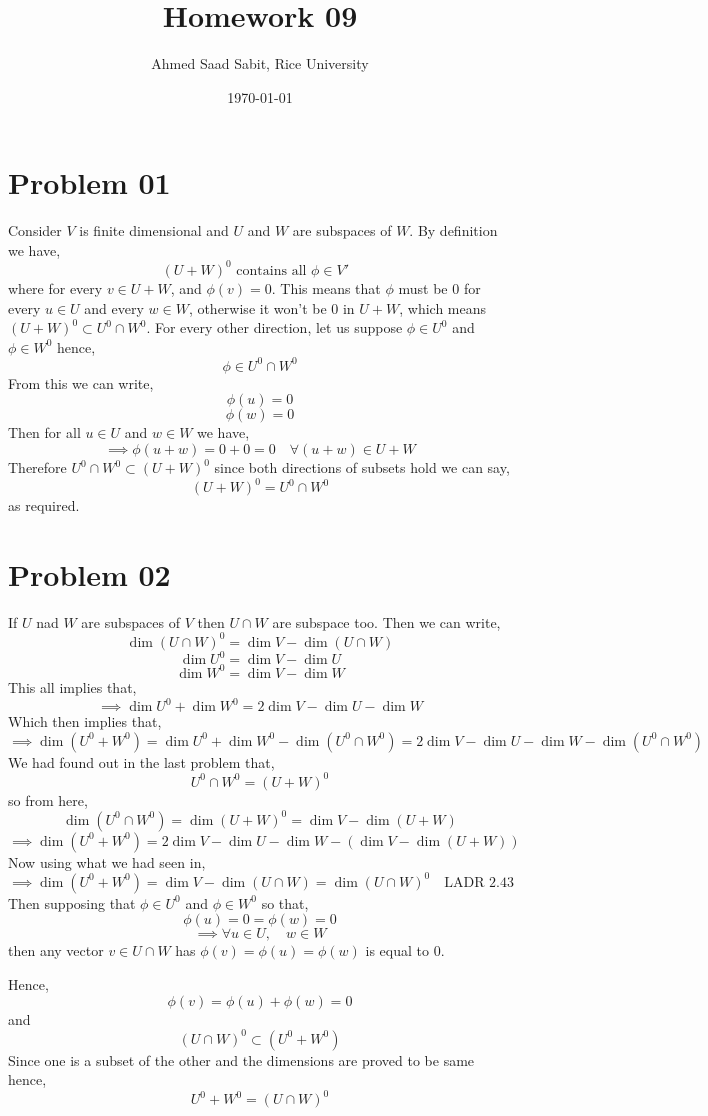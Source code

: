\documentclass[letter]{article}
\title{Homework 09}
\author{Ahmed Saad Sabit, Rice University}
\date{\today}
\begin{document}
\maketitle
\section{Problem 01} 
Consider $V$ is finite dimensional and $U$ and $W$ are subspaces of $ W$. By definition we have, 
\[
	(U + W)^{0}  \text{ contains all $\phi \in V'$ }
\]
where for every $v \in  U + W $, and $\phi(v) = 0$. This means that $\phi$ must be $0$ for every $u \in U$ and every $w \in W$, otherwise it won't be $0$ in $U+W$, which means $(U + W) ^{0} \subset U^{0} \cap W^{0}$. For every other direction, let us suppose $\phi \in U^{0}$ and $\phi \in W^{0}$ hence, 
\[
\phi \in U^{0} \cap  W^{0}
\] 
From this we can write, 
\[
\phi(u) = 0
\] 
\[
\phi(w) = 0
\] 
Then for all $u \in U$ and $w \in W$ we have,
\[
\implies \phi(u+ w) = 0 + 0 = 0 \quad \forall  (u + w) \in U+W
\] 
Therefore $U^{0} \cap W^{0} \subset (U + W)^{0}$ since both directions of subsets hold we can say, 
\[
	(U + W)^{0} = U^{0} \cap  W^{0}
\] as required. 

\section*{Problem 02} 
If $U$ nad $W$ are subspaces of $V $ then $U \cap  W$ are subspace too. Then we can write, 
\[
\dim (U \cap  W)^{0} = 
\dim V - \dim (U \cap  W)
\] 
\[
\dim U^{0} = \dim V - \dim U
\] 
\[
\dim W^{0} = \dim V - \dim W
\] 
This all implies that, 
\[
\implies \dim U^{0} + \dim W^{0} = 2 \dim V - \dim U - \dim W
\] 
Which then implies that, 
\[
\implies \dim (U^{0} + W^{0}) = \dim U^{0} + \dim W^{0} - \dim (U^{0} \cap W^{0}) = 2 \dim V - \dim U - \dim W - \dim (U^{0} \cap W^{0})
\] 
We had found out in the last problem that, 
\[
U^{0} \cap W^{0} = (U + W)^{0}
\] so from here, 
\[
\dim (U^{0} \cap W^{0}) = \dim (U + W)^{0} = \dim V - \dim (U + W)
\] 
\[
\implies \dim (U^{0} + W^{0}) = 2 \dim V - \dim U - \dim W - 
\left(\dim V - \dim (U + W)\right)
\]
Now using what we had seen in, 
\[
\implies \dim (U^{0} + W^{0}) = \dim V - \dim (U \cap  W) = \dim (U \cap  W)^{0} \quad \text{LADR 2.43}
\]
Then supposing that $\phi \in U^{0}$ and $\phi \in  W^{0}$ so that, 
\[
\phi(u) = 0 = \phi(w) = 0
\] 
\[
\implies \forall u \in U, \quad w \in W
\] then any vector $v \in U \cap W$ has $\phi(v) = \phi(u) = \phi(w)$ is equal to 0. 

Hence, 
\[
\phi(v) = \phi(u) + \phi(w) = 0
\] and
\[
	(U \cap W)^{0} \subset (U^{0} + W^{0})
\] 
Since one is a subset of the other and the dimensions are proved to be same hence, 
\[
U^{0} + W^{0} = (U \cap  W)^{0}
\]
\end{document}
